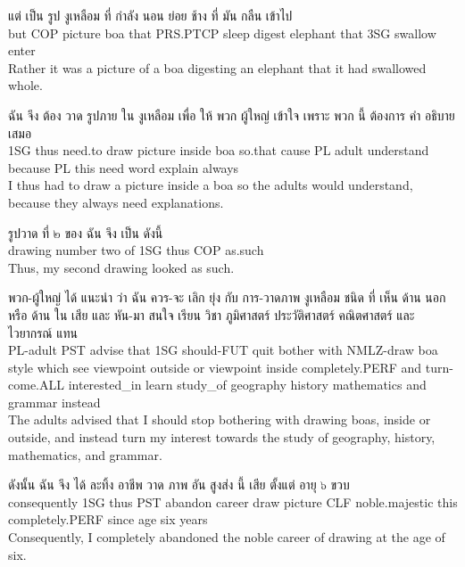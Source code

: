 \documentclass{book}
\begin{document}
	\begin{exe}
		\ex
		\gll แต่ เป็น รูป งูเหลือม ที่ กำลัง นอน ย่อย ช้าง ที่ มัน กลืน เข้าไป\\
		but \textsc{COP} picture boa that \textsc{PRS.PTCP} sleep digest elephant that \textsc{3SG} swallow enter\\
		\glt  Rather it was a picture of a boa digesting an elephant that it had swallowed whole.
	\end{exe}

	\begin{exe}
		\ex
		\gll ฉัน จึง ต้อง วาด รูปภาย ใน งูเหลือม เพื่อ ให้ พวก ผู้ใหญ่ เข้าใจ เพราะ พวก นี้ ต้องการ คำ อธิบาย เสมอ\\
		\textsc{1SG} thus need.to draw picture inside boa so.that cause \textsc{PL} adult understand because \textsc{PL} this need word explain always\\
		\glt  I thus had to draw a picture inside a boa so the adults would understand, because they always need explanations.
	\end{exe}

	\begin{exe}
		\ex
		\gll รูปวาด ที่ ๒ ของ ฉัน จึง เป็น ดังนี้\\
		drawing number two of \textsc{1SG} thus \textsc{COP} as.such\\
		\glt Thus, my second drawing looked as such.
	\end{exe}

	\begin{exe}
		\ex
		\gll พวก-ผู้ใหญ่ ได้ แนะนำ ว่า ฉัน ควร-จะ เลิก ยุ่ง กับ การ-วาดภาพ งูเหลือม ชนิด ที่ เห็น ด้าน นอก หรือ ด้าน ใน เสีย และ หัน-มา สนใจ เรียน วิชา ภูมิศาสตร์ ประวัติศาสตร์ คณิตศาสตร์ และ ไวยากรณ์ แทน\\
		\textsc{PL}-adult \textsc{PST} advise that \textsc{1SG} should-\textsc{FUT} quit bother with \textsc{NMLZ}-draw boa style which see viewpoint outside or viewpoint inside completely.\textsc{PERF} and turn-come.\textsc{ALL} interested\_in learn study\_of geography history mathematics and grammar instead\\
		\glt The adults advised that I should stop bothering with drawing boas, inside or outside, and instead turn my interest towards the study of geography, history, mathematics, and grammar.
	\end{exe}

	\begin{exe}
		\ex
		\gll ดังนั้น ฉัน จึง ได้ ละทิ้ง อาชีพ วาด ภาพ อัน สูงส่ง นี้ เสีย ตั้งแต่ อายุ ๖ ขวบ\\
		consequently \textsc{1SG} thus \textsc{PST} abandon career draw picture \textsc{CLF} noble.majestic this completely.\textsc{PERF} since age six years\\
		Consequently, I completely abandoned the noble career of drawing at the age of six.
	\end{exe}
\end{document}
